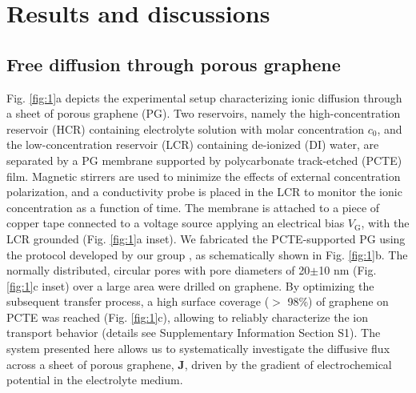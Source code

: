 \documentclass[journal=langd5,email=true, hyperref=true, keywords=false]{achemso}
\newcommand{\Fig}{Fig.}
\begin{document}
\section{Results and discussions}
\label{sec:res}

\subsection{Free diffusion through porous graphene}
\label{sec:res-1}

\Fig{} \ref{fig:1}a depicts the experimental setup characterizing
ionic diffusion through a sheet of porous graphene (PG). Two
reservoirs, namely the high-concentration reservoir (HCR) containing
electrolyte solution with molar concentration $c_0$, and the
low-concentration reservoir (LCR) containing de-ionized (DI) water,
are separated by a PG membrane supported by polycarbonate track-etched
(PCTE) film. Magnetic stirrers are used to minimize the effects of
external concentration polarization, and a conductivity probe is
placed in the LCR to monitor the ionic concentration as a function of
time. The membrane is attached to a piece of copper tape connected to
a voltage source applying an electrical bias $V_{\mathrm{G}}$, with
the LCR grounded (\Fig{} \ref{fig:1}a inset). We fabricated the
PCTE-supported PG using the protocol developed by our group
\cite{Choi_2018}, as schematically shown in \Fig{} \ref{fig:1}b. The
normally distributed, circular pores with pore diameters of 20$\pm$10
nm (\Fig{} \ref{fig:1}c inset) over a large area were drilled on
graphene.  By optimizing the subsequent transfer process, a high
surface coverage ($>$ 98\%) of graphene on PCTE was reached (\Fig{}
\ref{fig:1}c), allowing to reliably characterize the ion transport
behavior (details see Supplementary Information Section S1).  The
system presented here allows us to systematically investigate the
diffusive flux across a sheet of porous graphene, $\boldsymbol{J}$,
driven by the gradient of electrochemical potential in the electrolyte
medium.
\end{document}
